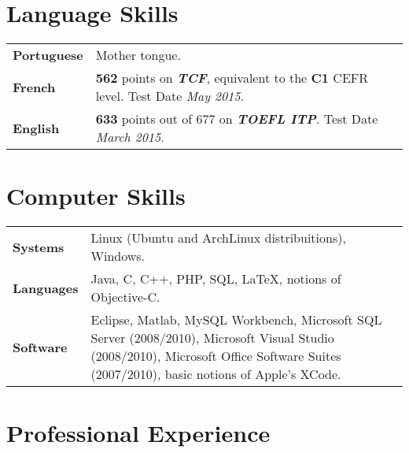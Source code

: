 \documentclass[10pt, a4paper]{article}
\begin{document}



\section{Language Skills}

\begin{tabular}{p{} p{}}

\textbf{Portuguese} & Mother tongue.  \\ 

 
\textbf{French} & \textbf{562} points on \textbf{\textit{TCF}},
equivalent to the \textbf{C1} CEFR level. Test Date \textit{May 2015}.
\\


\textbf{English} & \textbf{633} points out of 677 on \textbf{\textit{TOEFL
ITP}}. Test Date \textit{March 2015}.
\\

\end{tabular}


\section{Computer Skills}

\begin{tabular}{p{} p{}}

 \textbf{Systems} & Linux (Ubuntu and ArchLinux distribuitions),
 Windows.
 \\

 \textbf{Languages} & Java, C, C++, PHP,  SQL, \LaTeX, notions of Objective-C.
 \\
 
 \textbf{Software} & Eclipse, Matlab, MySQL Workbench,  Microsoft SQL Server
 (2008/2010), Microsoft Visual Studio (2008/2010),  Microsoft Office Software
 Suites (2007/2010), basic notions of Apple’s XCode. \\
\end{tabular}


\section{Professional Experience}
\end{document}
